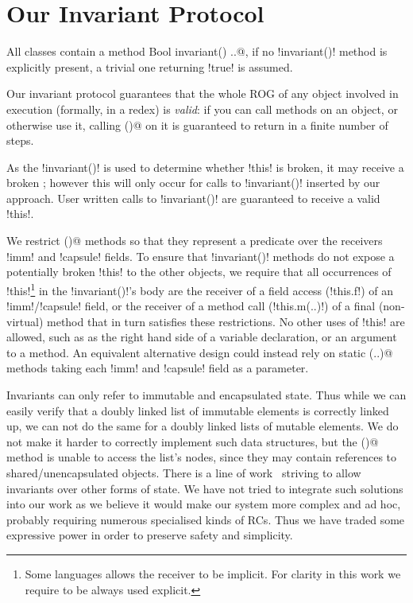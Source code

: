 \section{Our Invariant Protocol}
\label{s:protocol}
All classes contain a \Q@read method Bool invariant() {..}@, if no \Q!invariant()! method is explicitly present, a trivial one returning \Q!true! is assumed.

Our invariant protocol guarantees that the whole ROG of any object involved in execution (formally, in a redex) is \emph{valid}: if you can call methods on an object, or otherwise use it, calling \Q@invariant()@ on it is guaranteed to return \Q@true@ in a finite number of steps.

As the \Q!invariant()! is used to determine whether \Q!this! is broken, it may receive a broken \Q@this@; however this will only occur for calls to \Q!invariant()! inserted by our approach. User written calls to \Q!invariant()! are guaranteed to receive a valid \Q!this!.

We restrict \Q@invariant()@ methods so that they represent a predicate over the receivers \Q!imm! and \Q!capsule! fields. To ensure that \Q!invariant()! methods do not expose a potentially broken \Q!this! to the other objects, we require that all occurrences of \Q!this!\footnote{Some languages allows the \Q@this@ receiver to be implicit. For clarity in this work we require \Q@this@ to be always used explicit.} 
in the \Q!invariant()!'s body are the receiver of a field access (\Q!this.f!) of an \Q!imm!/\Q!capsule! field, or the receiver of a method call (\Q!this.m(..)!) of a final (non-virtual) method that in turn satisfies these restrictions. No other uses of \Q!this! are allowed, such as as the right hand side of a variable declaration, or an argument to a method.
An equivalent alternative design could instead rely on static \Q@invariant(..)@ methods taking each \Q!imm! and \Q!capsule! field as a parameter.

Invariants can only refer to immutable and encapsulated state. Thus while we can easily verify that a doubly linked list of immutable elements
is correctly linked up,
we can not do the same for a doubly linked lists of mutable elements. We do not make it harder to correctly implement such data structures, 
but the \Q@invariant()@ method is unable to access the list's nodes, since they may contain \Q@mut@ references to shared/unencapsulated objects.
There is a line of work~\cite{DBLP:conf/mpc/BarnettN04} striving to allow invariants over other forms of state.
We have not tried to integrate such solutions into our work as we believe it would make our system more complex and ad hoc, probably requiring numerous specialised kinds of RCs.
Thus we have traded some expressive power in order to preserve safety and simplicity.

